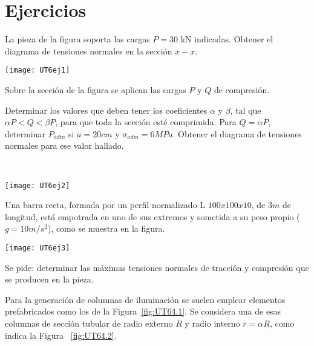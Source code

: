 \section{Ejercicios}
\setcounter{ejercicio}{0}

\ejercicio 

La pieza de la figura soporta las cargas $P=30$ kN indicadas. Obtener el diagrama de tensiones normales en la sección $x-x$.

\begin{center}
  \texttt{[image: UT6ej1]}
\end{center}

\ejercicio 

\begin{minipage}[b]{0.55\textwidth}
Sobre la sección de la figura se aplican las cargas $P$ y $Q$ de compresión.

\parte Determinar los valores que deben tener los coeficientes $\alpha$ y $\beta$, tal que $\alpha P < Q < \beta P$, para que toda la sección esté comprimida.
\parte Para $Q= \alpha P$, determinar $P_{adm}$ si $a=20cm$ y $\sigma_{adm}=6MPa$. Obtener el diagrama de tensiones normales para ese valor hallado.
\end{minipage}
~
\begin{minipage}[b]{0.45\textwidth}
\begin{center}
	\texttt{[image: UT6ej2]}
\end{center}
\end{minipage}

\ejercicio 

Una barra recta, formada por un perfil normalizado L $100x100x10$, de $3m$ de longitud, está empotrada en uno de sus extremos y sometida a su peso propio ($g=10 m/s^2$), como se muestra en la figura.


\begin{center}
\texttt{[image: UT6ej3]}
\end{center}

Se pide: determinar las máximas tensiones normales de tracción y compresión que se producen en la pieza.

\ejercicio 

Para la generación de columnas de iluminación se suelen emplear elementos prefabricados como los de la Figura~\ref{fig:UT64.1}. Se considera una de esas columnas de sección tubular de radio externo $R$ y radio interno $r= \alpha R$, como indica la Figura ~\ref{fig:UT64.2}.

